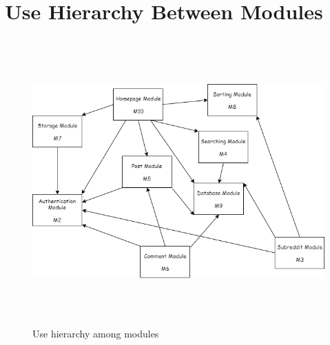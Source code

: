 \documentclass[12pt,fleqn]{article}
\begin{document}
\section{Use Hierarchy Between Modules} \label{sec:usehierarchy}
\begin{figure}[H]
\centering
\includegraphics[width=17cm, height=11cm]{uses}
\caption{Use hierarchy among modules}
\label{FigUH}
\end{figure}
\end{document}
